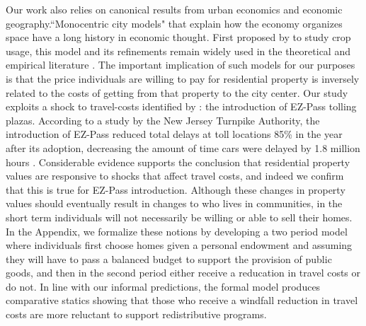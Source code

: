 Our work also relies on canonical results from urban economics and economic geography.``Monocentric city models" that explain how the economy organizes space have a long history in economic thought. First proposed by \textcite{Thunen1826} to study crop usage, this model and its refinements remain widely used in the theoretical and empirical literature \parencite{Alonso,Fujita1999,BaumSnow2007}. The important implication of such models for our purposes is that the price individuals are willing to pay for residential property is inversely related to the costs of getting from that property to the city center. Our study exploits a shock to travel-costs identified by \textcite{Currie2011a}: the introduction of EZ-Pass tolling plazas. According to a study by the New Jersey Turnpike Authority, the introduction of EZ-Pass reduced total delays at toll locations 85\% in the year after its adoption, decreasing the amount of time cars were delayed by 1.8 million hours \parencite{NJT2001}. Considerable evidence supports the conclusion that residential property values are responsive to shocks that affect travel costs, and indeed we confirm that this is true for EZ-Pass introduction. Although these changes in property values should eventually result in changes to who lives in communities, in the short term individuals will not necessarily be willing or able to sell their homes. In the Appendix, we formalize these notions by developing a two period model where individuals first choose homes given a personal endowment and assuming they will have to pass a balanced budget to support the provision of public goods, and then in the second period either receive a reducation in travel costs or do not. In line with our informal predictions, the formal model produces comparative statics showing that those who receive a windfall reduction in travel costs are more reluctant to support redistributive programs.



